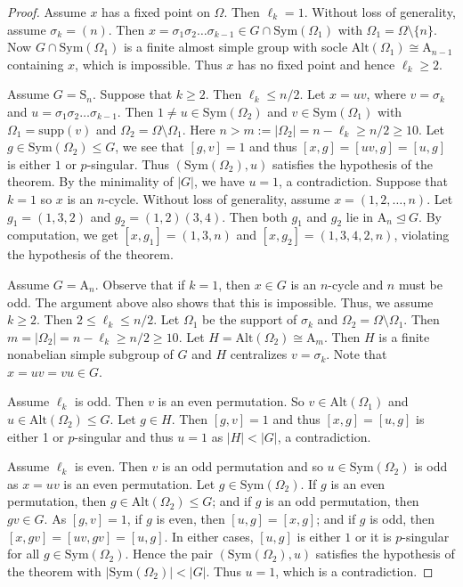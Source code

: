 \documentclass[10pt,a4paper]{amsart}
\newcommand{\AAA}{\mathrm {A}}
\newcommand{\Alt}{\mathrm {Alt}}
\newcommand{\SSS}{\mathrm {S}}
\newcommand{\Sym}{\mathrm {Sym}}
\renewcommand{\leq}{\leqs}
\newcommand{\leqs}{\leqslant}
\newcommand{\supp}{\mathrm {supp}}
\begin{document}
\begin{proof}
Assume $x$ has a fixed point on $\Omega$. Then $\ell_k=1$. Without loss of generality, assume $\sigma_k=(n)$. Then $x=\sigma_1\sigma_2\dots\sigma_{k-1}\in G\cap \Sym(\Omega_1)$ with $\Omega_1=\Omega\setminus \{n\}$. Now $G\cap \Sym(\Omega_1)$ is a finite almost simple group with socle $\Alt(\Omega_1)\cong \AAA_{n-1}$ containing $x$, which is impossible.  Thus  $x$ has no fixed point and hence $\ell_k\ge 2.$ 




Assume  $G=\SSS_n$. Suppose that $k\ge 2.$ Then $\ell_k\leq n/2$. Let $x=uv$, where $v=\sigma_k$ and $u=\sigma_1\sigma_2\dots \sigma_{k-1}$. Then $1\neq u\in\Sym(\Omega_2)$ and $v\in\Sym(\Omega_1)$ with $\Omega_1=\supp(v)$ and $\Omega_2=\Omega\setminus \Omega_1.$  Here $n>m:=|\Omega_2|=n-\ell_k\ge n/2\ge 10$. Let $g\in\Sym(\Omega_2)\leq G$, we see that $[g,v]=1$ and thus $[x,g]=[uv,g]=[u,g]$ is either $1$ or $p$-singular. Thus $(\Sym(\Omega_2),u)$ satisfies the hypothesis of the theorem. By the minimality of $|G|$, we have $u=1$,  a contradiction. Suppose that $k=1$ so $x$ is an $n$-cycle. Without loss of generality, assume $x=(1,2,\dots,n)$. Let $g_1=(1,3,2)$ and $g_2=(1,2)(3,4)$. Then both $g_1$ and $g_2$ lie in $\AAA_n\unlhd G$. By computation, we get $[x,g_1]=(1,3,n)$ and $[x,g_2]=(1,3,4,2,n)$, violating the hypothesis of the theorem.

Assume $G=\AAA_n.$ Observe that if $k=1$, then $x\in G$ is an $n$-cycle and $n$ must be odd. The argument above also shows that this is impossible. Thus, we assume $k\ge 2.$  Then $2\leq \ell_k\leq n/2$. Let $\Omega_1$ be the support of $\sigma_k$ and $\Omega_2=\Omega\setminus\Omega_1$. Then $m=|\Omega_2|=n-\ell_k\ge  n/2 \ge 10.$ Let $H=\Alt(\Omega_2)\cong \AAA_m$. Then $H$ is a finite nonabelian simple subgroup of $G$ and $H$ centralizes $v=\sigma_k$. Note that $x=uv=vu\in G.$

Assume $\ell_k$ is odd. Then $v$ is an even permutation. So $v\in\Alt(\Omega_1)$ and $u\in \Alt(\Omega_2)\leq G$. Let $g\in  H$. Then $[g,v]=1$ and thus $[x,g]=[u,g]$ is either 1 or $p$-singular and thus $u=1$ as $|H|<|G|$, a contradiction.

 Assume $\ell_k$ is even. Then $v$ is an odd permutation and so $u\in\Sym(\Omega_2)$ is odd as $x=uv$ is an even permutation.  Let $g\in\Sym(\Omega_2)$. If $g$ is an even permutation, then $g\in\Alt(\Omega_2)\leq G$; and if $g$ is an odd permutation, then $gv\in G$. As $[g,v]=1$, if $g$ is even, then $[u,g]=[x,g]$; and if $g$ is odd, then $[x,gv]=[uv,gv]=[u,g]$. In either cases, $[u,g]$ is either $1$ or it is $p$-singular for all $g\in \Sym(\Omega_2)$. Hence the pair $(\Sym(\Omega_2),u)$ satisfies the hypothesis of the theorem with $|\Sym(\Omega_2)|<|G|$. Thus $u=1$, which is a contradiction.


\end{proof}
\end{document}
